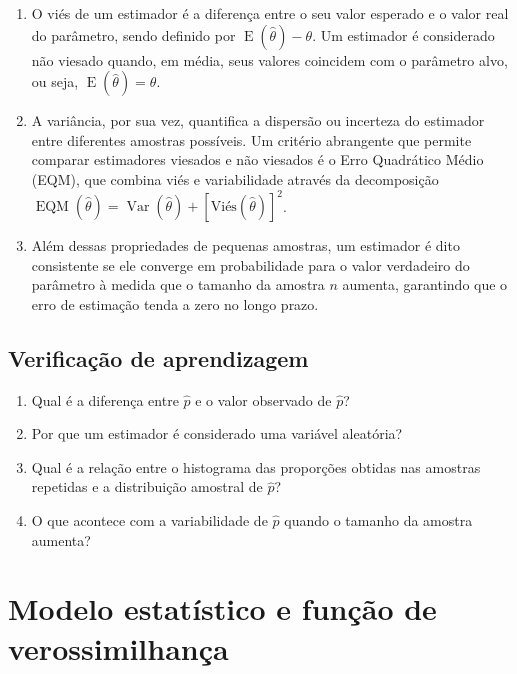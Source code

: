 \documentclass[
  letterpaper,
  DIV=11,
  numbers=noendperiod]{scrreprt}
\begin{document}
\begin{enumerate}
\def\labelenumi{\arabic{enumi}.}
\item
  O viés de um estimador é a diferença entre o seu valor esperado e o
  valor real do parâmetro, sendo definido por
  \(\operatorname{E}(\hat \theta) - \theta\). Um estimador é considerado
  não viesado quando, em média, seus valores coincidem com o parâmetro
  alvo, ou seja, \(\operatorname{E}(\hat \theta) = \theta\).
\item
  A variância, por sua vez, quantifica a dispersão ou incerteza do
  estimador entre diferentes amostras possíveis. Um critério abrangente
  que permite comparar estimadores viesados e não viesados é o Erro
  Quadrático Médio (EQM), que combina viés e variabilidade através da
  decomposição
  \(\operatorname{EQM}(\hat \theta) = \operatorname{Var}(\hat \theta) + [\text{Viés}(\hat \theta)]^2\).
\item
  Além dessas propriedades de pequenas amostras, um estimador é dito
  consistente se ele converge em probabilidade para o valor verdadeiro
  do parâmetro à medida que o tamanho da amostra \(n\) aumenta,
  garantindo que o erro de estimação tenda a zero no longo prazo.
\end{enumerate}

\subsection*{Verificação de
aprendizagem}\label{verificauxe7uxe3o-de-aprendizagem-2}

\begin{enumerate}
\def\labelenumi{\arabic{enumi}.}
\item
  Qual é a diferença entre \(\widehat{p}\) e o valor observado de
  \(\widehat{p}\)?
\item
  Por que um estimador é considerado uma variável aleatória?
\item
  Qual é a relação entre o histograma das proporções obtidas nas
  amostras repetidas e a distribuição amostral de \(\widehat{p}\)?
\item
  O que acontece com a variabilidade de \(\widehat{p}\) quando o tamanho
  da amostra aumenta?
\end{enumerate}

\section{Modelo estatístico e função de
verossimilhança}\label{modelo-estatuxedstico-e-funuxe7uxe3o-de-verossimilhanuxe7a}
\end{document}
